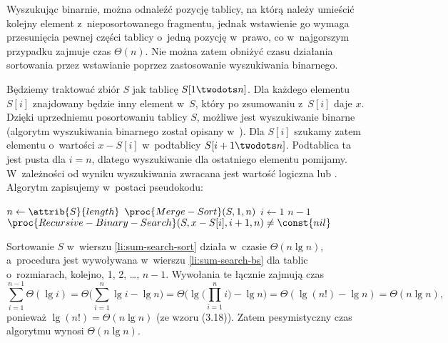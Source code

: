 \exercise %
Wyszukując binarnie, można odnaleźć pozycję tablicy, na którą należy umieścić kolejny element z~nieposortowanego fragmentu, jednak wstawienie go wymaga przesunięcia pewnej części tablicy o~jedną pozycję w~prawo, co w~najgorszym przypadku zajmuje czas $\Theta(n)$.
Nie można zatem obniżyć czasu działania sortowania przez wstawianie poprzez zastosowanie wyszukiwania binarnego.

\exercise %
Będziemy traktować zbiór $S$ jak tablicę $S[1\twodots n]$.
Dla każdego elementu $S[i]$ znajdowany będzie inny element w~$S$, który po zsumowaniu z~$S[i]$ daje $x$.
Dzięki uprzedniemu posortowaniu tablicy $S$, możliwe jest wyszukiwanie binarne (algorytm wyszukiwania binarnego został opisany w~).
Dla $S[i]$ szukamy zatem elementu o~wartości $x-S[i]$ w~podtablicy $S[i+1\twodots n]$.
Podtablica ta jest pusta dla $i=n$, dlatego wyszukiwanie dla ostatniego elementu pomijamy.
W~zależności od wyniku wyszukiwania zwracana jest wartość logiczna  lub .
Algorytm zapisujemy w~postaci pseudokodu:
\begin{codebox}
\li	$n\gets\attrib{S}{length}$
\li	$\proc{Merge-Sort}(S,1,n)$ \label{li:sum-search-sort}
\li	\For $i\gets1$ \To $n-1$
\li		\Do \If $\proc{Recursive-Binary-Search}(S,x-S[i],i+1,n)\ne\const{nil}$ \label{li:sum-search-bs}
\li				\Then \Return {}
				\End
		\End
\li	\Return {}
\end{codebox}

Sortowanie $S$ w~wierszu \ref{li:sum-search-sort} działa w~czasie $\Theta(n\lg n)$, a~procedura  jest wywoływana w~wierszu \ref{li:sum-search-bs} dla tablic o~rozmiarach, kolejno, 1, 2, \dots, $n-1$.
Wywołania te łącznie zajmują czas
\[
	\sum_{i=1}^{n-1}\Theta(\lg i) = \Theta\biggl(\sum_{i=1}^n\lg i-\lg n\biggr) = \Theta\biggl(\lg\biggl(\prod_{i=1}^ni\biggr)-\lg n\biggr) = \Theta(\lg(n!)-\lg n) = \Theta(n\lg n),
\]
ponieważ $\lg(n!)=\Theta(n\lg n)$ (ze wzoru (3.18)).
Zatem pesymistyczny czas algorytmu  wynosi $\Theta(n\lg n)$.
